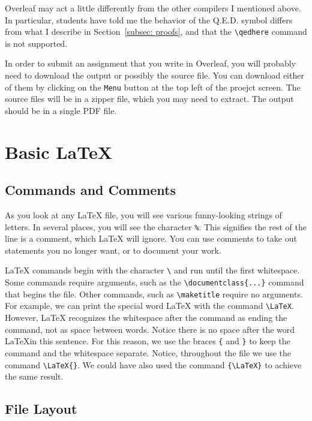 \documentclass[titlepage]{article}                %
\theoremstyle{definition}
\theoremstyle{remark}
\begin{document}
Overleaf may act a little differently from the other compilers I mentioned above.  In particular, students have told me the behavior of the Q.E.D. symbol differs from what I describe in Section~\ref{subsec: proofs}, and that the \verb|\qedhere| command is not supported.


In order to submit an assignment that you write in Overleaf, you will probably need to download the output or possibly the source file.  You can download either of them by clicking on the \verb|Menu| button at the top left of the proejct screen.  The source files will be in a zipper file, which you may need to extract.  The output should be in a single PDF file.

\section{Basic \LaTeX}
\label{basic}

\subsection{Commands and Comments}
\label{sec: comments}

As you look at any \LaTeX{} file, you will see various funny-looking strings
of letters.  In several places, you will see the character \verb=%=.  This
signifies the rest of the line is a comment, which \LaTeX{} will ignore.  You
can use comments to take out statements you no longer want, or to document
your work.

\LaTeX{} commands begin with the character \verb=\= and run until the first
whitespace.  Some commands require arguments, such as the
\verb=\documentclass{...}= command that begins the file.  Other commands, such
as \verb=\maketitle= require no arguments.  For example, we can print the
special word \LaTeX{} with the command \verb=\LaTeX=.  However, \LaTeX{}
recognizes the whitespace after the command as ending the command, not as
space between words.  Notice there is no space after the word \LaTeX in this
sentence.  For this reason, we use the braces \verb={= and \verb=}= to keep
the command and the whitespace separate.  Notice, throughout the file we use
the command \verb=\LaTeX{}=.  We could have also used the command
\verb={\LaTeX}= to achieve the same result.


\subsection{File Layout}
\end{document}

